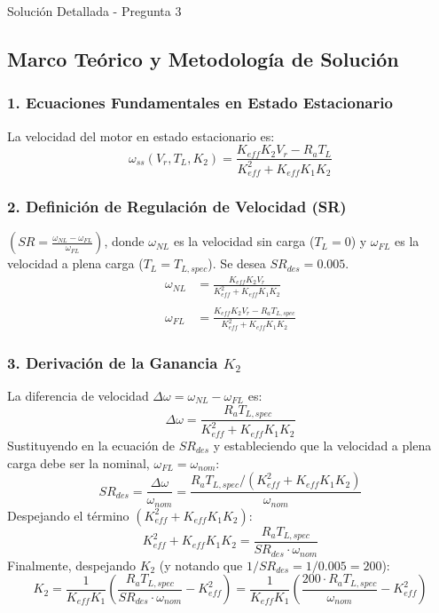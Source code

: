 \documentclass[12pt]{article}
\begin{document}
\begin{solutionbox}{Solución Detallada - Pregunta 3}
\subsection*{Marco Teórico y Metodología de Solución}

\subsubsection*{1. Ecuaciones Fundamentales en Estado Estacionario}
La velocidad del motor en estado estacionario es:
\begin{equation}
    \omega_{ss}(V_r, T_L, K_2) = \frac{K_{eff}K_2 V_r - R_a T_L}{K_{eff}^2 + K_{eff}K_1K_2}
\end{equation}

\subsubsection*{2. Definición de Regulación de Velocidad (SR)}
$(SR = \frac{\omega_{NL} - \omega_{FL}}{\omega_{FL}})$, donde $\omega_{NL}$ es la velocidad sin carga ($T_L=0$) y $\omega_{FL}$ es la velocidad a plena carga ($T_L=T_{L,spec}$). Se desea $SR_{des} = 0.005$.
\begin{align*}
    \omega_{NL} &= \frac{K_{eff}K_2 V_r}{K_{eff}^2 + K_{eff}K_1K_2} \\\\
    \omega_{FL} &= \frac{K_{eff}K_2 V_r - R_a T_{L,spec}}{K_{eff}^2 + K_{eff}K_1K_2}
\end{align*}

\subsubsection*{3. Derivación de la Ganancia $K_2$}
La diferencia de velocidad $\Delta\omega = \omega_{NL} - \omega_{FL}$ es:
\[ \Delta\omega = \frac{R_a T_{L,spec}}{K_{eff}^2 + K_{eff}K_1K_2} \]
Sustituyendo en la ecuación de $SR_{des}$ y estableciendo que la velocidad a plena carga debe ser la nominal, $\omega_{FL} = \omega_{nom}$:\n
\[ SR_{des} = \frac{\Delta\omega}{\omega_{nom}} = \frac{R_a T_{L,spec} / (K_{eff}^2 + K_{eff}K_1K_2)}{\omega_{nom}} \]
Despejando el término $(K_{eff}^2 + K_{eff}K_1K_2)$:\n
\[ K_{eff}^2 + K_{eff}K_1K_2 = \frac{R_a T_{L,spec}}{SR_{des} \cdot \omega_{nom}} \]
Finalmente, despejando $K_2$ (y notando que $1/SR_{des} = 1/0.005 = 200$):\n
\begin{equation}\label{eq:K2_calc_p3}
    K_2 = \frac{1}{K_{eff}K_1} \left( \frac{R_a T_{L,spec}}{SR_{des} \cdot \omega_{nom}} - K_{eff}^2 \right) = \frac{1}{K_{eff}K_1} \left( \frac{200 \cdot R_a T_{L,spec}}{\omega_{nom}} - K_{eff}^2 \right)
\end{equation}


\end{solutionbox}
\end{document}
